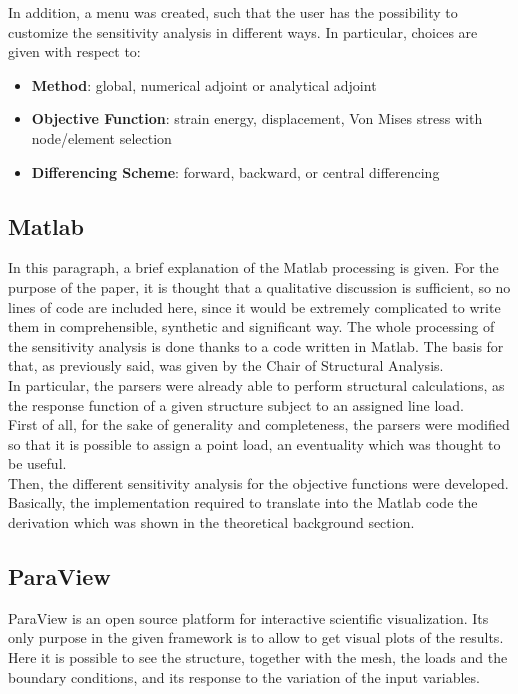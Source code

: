 In addition, a menu was created, such that the user has the possibility to customize the sensitivity analysis in different ways. In particular, choices are given with respect to: 
\begin {itemize}
\item \textbf{Method}: global, numerical adjoint or analytical adjoint
\item \textbf{Objective Function}: strain energy, displacement, Von Mises stress with node/element selection
\item \textbf{Differencing Scheme}: forward, backward, or central differencing
\end{itemize}
\subsection{Matlab}
In this paragraph, a brief explanation of the Matlab processing is given. For the purpose of the paper, it is thought that a qualitative discussion is sufficient, so no lines of code are included here, since it would be extremely complicated to write them in comprehensible, synthetic and significant way. The whole processing of the sensitivity analysis is done thanks to a code written in Matlab. The basis for that, as previously said, was given by the Chair of Structural Analysis.\\[6pt]
In particular, the parsers were already able to perform structural calculations, as the response function of a given structure subject to an assigned line load. \\[6pt]
First of all, for the sake of generality and completeness, the parsers were modified so that it is possible to assign a point load, an eventuality which was thought to be useful.\\[6pt]
Then, the different sensitivity analysis for the objective functions were developed. Basically, the implementation required to translate into the Matlab code the derivation which was shown in the theoretical background section. 

\subsection{ParaView}
ParaView is an open source platform for interactive scientific visualization. Its only purpose in the given framework is to allow to get visual plots of the results. Here it is possible to see the structure, together with the mesh, the loads and the boundary conditions, and its response to the variation of the input variables. 

